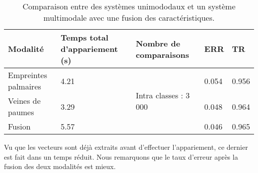 \begin{table}[H]
	\centering
 
	\begin{tabular}{|l|p{3cm}|l|l|l|}
		\hline
		\textbf{Modalité} & \textbf{Temps total d’appariement (s)} & \textbf{Nombre de comparaisons} & \textbf{ERR} & \textbf{TR} \\ \hline
	Empreintes palmaires & 4.21 & \multirow{3}{*}{Intra classes : 3 000} & 0.054 & 0.956 \\ \cline{1-2} \cline{4-5} 
	Veines de paumes  & 3.29 &          & 0.048 & 0.964 \\ \cline{1-2} \cline{4-5} 
	Fusion    & 5.57 &          & 0.046 & 0.965 \\ \hline	\end{tabular}
	\caption{Comparaison entre des systèmes unimododaux et un système multimodale avec une fusion des caractéristiques.\label{comp3}}
\end{table}
Vu que les vecteurs sont déjà extraits avant d’effectuer l’appariement, ce dernier est fait dans un temps réduit. Nous remarquons que le taux d’erreur après la fusion des deux modalités est mieux. 
